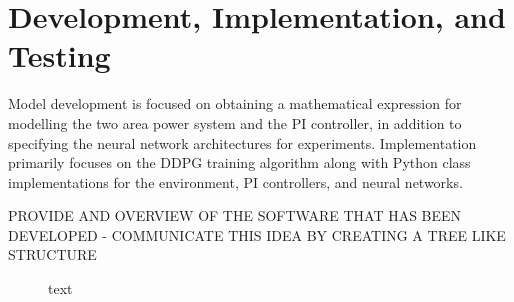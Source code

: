 \chapter{Development, Implementation, and Testing}
Model development is focused on obtaining a mathematical expression for modelling the two area power system and the PI controller, in addition to specifying the neural network architectures for experiments. Implementation primarily focuses on the DDPG training algorithm along with Python class implementations for the environment, PI controllers, and neural networks.

PROVIDE AND OVERVIEW OF THE SOFTWARE THAT HAS BEEN DEVELOPED - COMMUNICATE THIS IDEA BY CREATING A TREE LIKE STRUCTURE

\begin{figure}[h]
	\centering
	
	\caption{text}
\end{figure}











